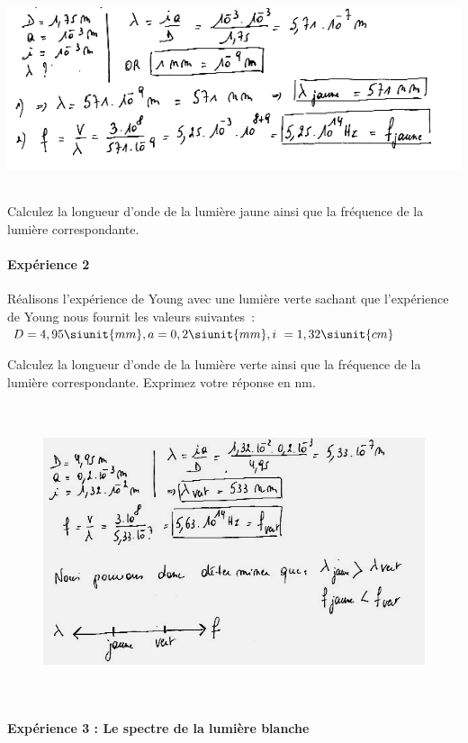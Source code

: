 \includegraphics[width=16.82cm,height=5.733cm]{Pictures/1000000100000243000000D01464CBCF0F7AAEC1.png}

Calculez la longueur d'onde de la lumière jaune ainsi que la fréquence de la
lumière correspondante.

\paragraph{Expérience 2}
Réalisons l'expérience de Young avec une lumière verte
sachant que l'expérience de Young nous fournit les valeurs suivantes~:
$D=4,95 \siunit{mm}, a=0,2 \siunit{mm}, i~=1,32 \siunit{cm}$

Calculez la longueur d'onde de la lumière verte ainsi que la fréquence
de la lumière correspondante. Exprimez votre réponse en nm.

\begin{figure}
\centering
\includegraphics[width=15.833cm,height=8.654cm]{Pictures/100000010000023700000151168D50BCCC321003.png}
\caption{}
\end{figure}

\paragraph{Expérience 3 :  Le spectre de la lumière blanche}

